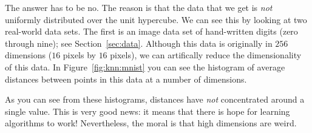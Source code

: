 
The answer has to be no.  The reason is that the data that we get is
\emph{not} uniformly distributed over the unit hypercube.  We can see
this by looking at two real-world data sets.  The first is an image
data set of hand-written digits (zero through nine); see
Section~\ref{sec:data}.  Although this data is originally in
$256$ dimensions ($16$ pixels by $16$ pixels), we can artifically
reduce the dimensionality of this data.  In Figure~\ref{fig:knn:mnist}
you can see the histogram of average distances between points in this
data at a number of dimensions.

As you can see from these histograms, distances have \emph{not}
concentrated around a single value.  This is very good news: it means
that there is hope for learning algorithms to work!  Nevertheless, the
moral is that high dimensions are weird.








